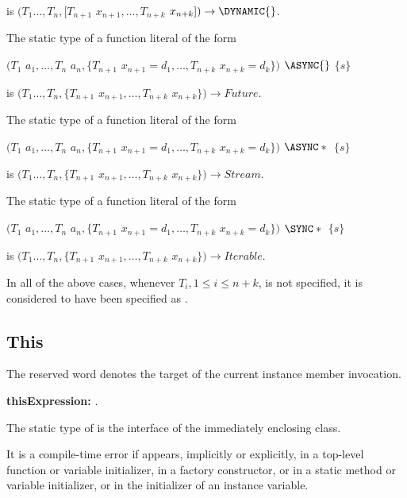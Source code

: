 \documentclass{article}
\begin{document}
is $(T_1 \ldots, T_n, [T_{n+1}$ $x_{n+1}, \ldots, T_{n+k}$ $x_{n+k}]) \rightarrow  \DYNAMIC{}$.


\LMHash{}
The static type of a function literal of the form

$(T_1$ $a_1, \ldots, T_n$ $a_n, \{T_{n+1}$ $x_{n+1} = d_1, \ldots,  T_{n+k}$ $x_{n+k} = d_k\})$ $\ASYNC{}$ $\{s\}$

is $(T_1 \ldots, T_n, \{T_{n+1}$ $x_{n+1}, \ldots, T_{n+k}$ $x_{n+k}\}) \rightarrow  Future{}$.

\LMHash{}
The static type of a function literal of the form

$(T_1$ $a_1, \ldots, T_n$ $a_n, \{T_{n+1}$ $x_{n+1} = d_1, \ldots,  T_{n+k}$ $x_{n+k} = d_k\})$ $\ASYNC*{}$ $\{s\}$

is $(T_1 \ldots, T_n, \{T_{n+1}$ $x_{n+1}, \ldots, T_{n+k}$ $x_{n+k}\}) \rightarrow  Stream{}$.

\LMHash{}
The static type of a function literal of the form

$(T_1$ $a_1, \ldots, T_n$ $a_n, \{T_{n+1}$ $x_{n+1} = d_1, \ldots,  T_{n+k}$ $x_{n+k} = d_k\})$ $\SYNC*{}$ $\{s\}$

is $(T_1 \ldots, T_n, \{T_{n+1}$ $x_{n+1}, \ldots, T_{n+k}$ $x_{n+k}\}) \rightarrow  Iterable{}$.

\LMHash{}
In all of the above cases, whenever $T_i, 1 \le i \le n+k$, is not specified, it is considered to have been specified as  \DYNAMIC{}.


\subsection{ This}

\LMHash{}
The reserved word \THIS{} denotes the target of the current instance member invocation.

\begin{grammar}
{\bf thisExpression:}
      \THIS{}
     .
\end{grammar}

\LMHash{}
The static type of \THIS{} is the interface of the immediately enclosing class.


\LMHash{}
It is a compile-time error if \THIS{} appears, implicitly or explicitly,  in a top-level function or variable initializer,  in a factory constructor, or in a static method or variable initializer, or in the initializer of an instance variable.
\end{document}
